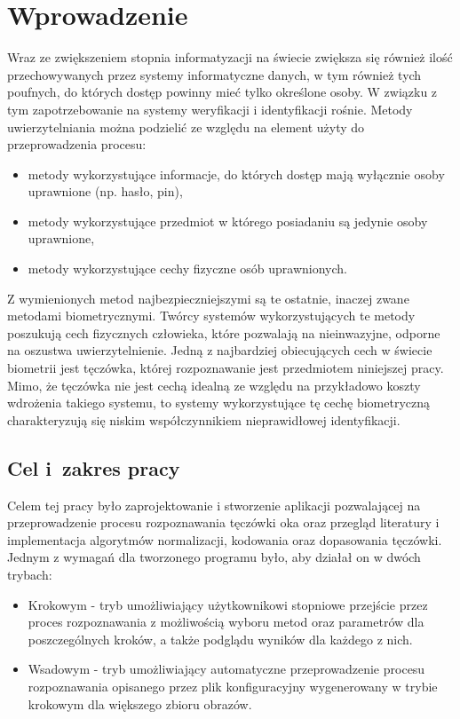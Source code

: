 \chapter{Wprowadzenie}


Wraz ze zwiększeniem stopnia informatyzacji na świecie zwiększa się również iloś\'c przechowywanych przez
systemy informatyczne danych, w tym również tych poufnych, do których dostęp powinny mie\'c tylko
określone osoby. W związku z tym zapotrzebowanie na systemy weryfikacji i identyfikacji rośnie. Metody
uwierzytelniania można podzieli\'c ze względu na element użyty do przeprowadzenia procesu:

\begin{itemize}
  \item metody wykorzystujące informacje, do których dostęp mają wyłącznie osoby uprawnione (np. hasło, pin),
  \item metody wykorzystujące przedmiot w którego posiadaniu są jedynie osoby uprawnione,
  \item metody wykorzystujące cechy fizyczne osób uprawnionych.
\end{itemize}

Z wymienionych metod najbezpieczniejszymi są te ostatnie, inaczej zwane metodami biometrycznymi.
Twórcy systemów wykorzystujących te metody poszukują cech fizycznych człowieka, które pozwalają na
nieinwazyjne, odporne na oszustwa uwierzytelnienie. Jedną z najbardziej obiecujących cech
w świecie biometrii jest tęczówka, której rozpoznawanie jest przedmiotem niniejszej pracy. Mimo, że
tęczówka nie jest cechą idealną ze względu na przykładowo koszty wdrożenia takiego systemu,
to systemy wykorzystujące tę cechę biometryczną charakteryzują się niskim współczynnikiem nieprawidłowej
identyfikacji.

\section{Cel i~zakres pracy}

Celem tej pracy było zaprojektowanie i stworzenie aplikacji pozwalającej na przeprowadzenie procesu
rozpoznawania tęczówki oka oraz przegląd literatury i implementacja algorytmów normalizacji,
kodowania oraz dopasowania tęczówki. Jednym z wymagań dla tworzonego programu było, aby działał
on w dwóch trybach:

\begin{itemize}
    \item Krokowym - tryb umożliwiający użytkownikowi stopniowe przejście przez proces rozpoznawania
    z możliwością wyboru metod oraz parametrów dla poszczególnych kroków, a także podglądu wyników dla
    każdego z nich.

    \item Wsadowym - tryb umożliwiający automatyczne przeprowadzenie procesu rozpoznawania opisanego przez
    plik konfiguracyjny wygenerowany w trybie krokowym dla większego zbioru obrazów.
\end{itemize}

